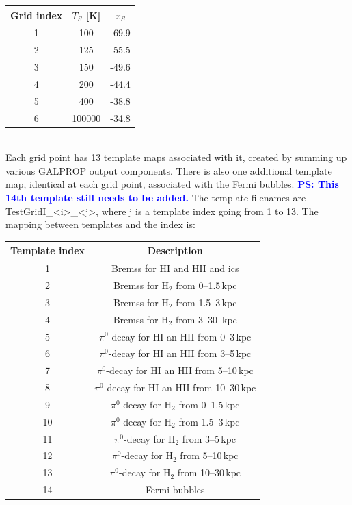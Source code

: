\documentclass{article}
\newcommand{\ps}[1]{\textcolor{blue}{{\bf PS: #1}}}
\begin{document}
   \begin{tabular}[h]{c|c|c}
      Grid index & $T_S$ [K] & $x_{S}$\\
      \hline
      1 & 100 & -69.9 \\
      2 & 125 & -55.5 \\
      3 & 150 & -49.6 \\
      4 & 200 & -44.4 \\
      5 & 400 & -38.8 \\
      6 & 100000 & -34.8 \\
   \end{tabular}\\
   
  Each grid point has 13 template maps associated with it, created by summing up various GALPROP
   output components.  There is also one additional template map, identical at each grid point, associated with the Fermi bubbles. \ps{This 14th template still needs to be added.}  
   The template filenames are TestGridI\_<i>\_<j>, where j
   is a template index going from 1 to 13.  The mapping between templates and
   the index is:\\
   
   \begin{tabular}[h]{c|c}
      Template index & Description \\
      \hline
      1 & Bremss for HI and HII and ics \\
      2 & Bremss for H$_2$ from 0--1.5\,kpc \\
      3 & Bremss for H$_2$ from 1.5--3\,kpc \\
      4 & Bremss for H$_2$ from 3--30 \,kpc \\
      5 & $\pi^0$-decay for HI an HII from 0--3\,kpc \\
      6 & $\pi^0$-decay for HI an HII from 3--5\,kpc \\
      7 & $\pi^0$-decay for HI an HII from 5--10\,kpc \\
      8 & $\pi^0$-decay for HI an HII from 10--30\,kpc \\
      9 & $\pi^0$-decay for H$_2$ from 0--1.5\,kpc \\
     10 & $\pi^0$-decay for H$_2$ from 1.5--3\,kpc \\
     11 & $\pi^0$-decay for H$_2$ from 3--5\,kpc \\
     12 & $\pi^0$-decay for H$_2$ from 5--10\,kpc \\
     13 & $\pi^0$-decay for H$_2$ from 10--30\,kpc \\
     14 & Fermi bubbles \\
   \end{tabular}\\
   
\end{document}
